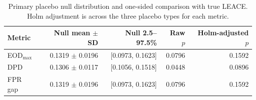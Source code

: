 \begin{table}[htbp]
\centering
\small
\caption{Primary placebo null distribution and one-sided comparison with true LEACE. Holm adjustment is across the three placebo types for each metric.}
\label{tab:placebo-v2}
\begin{tabular}{lrrrr}
\toprule
Metric & Null mean $\pm$ SD & Null 2.5--97.5\% & Raw $p$ & Holm-adjusted $p$ \\
\midrule
EOD$_{\max}$ & 0.1319 $\pm$ 0.0196 & [0.0973, 0.1623] & 0.0796 & 0.1592 \\
DPD & 0.1306 $\pm$ 0.0117 & [0.1056, 0.1518] & 0.0448 & 0.0896 \\
FPR gap & 0.1319 $\pm$ 0.0196 & [0.0973, 0.1623] & 0.0796 & 0.1592 \\
\bottomrule
\end{tabular}
\end{table}
